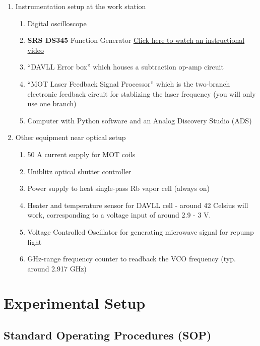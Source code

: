 \documentclass{../lab}
\begin{document}
\begin{enumerate}
    \item Instrumentation setup at the work station
    \begin{enumerate}
        \item Digital oscilloscope
        \item \textbf{SRS DS345} Function Generator \href{https://youtu.be/PrM8DHFOFS0}{Click here to watch an instructional video}
        \item ``DAVLL Error box'' which houses a subtraction op-amp circuit
        \item ``MOT Laser Feedback Signal Processor'' which is the two-branch electronic feedback circuit for stablizing the laser frequency (you will only use one branch)
        \item Computer with Python software and an Analog Discovery Studio (ADS)
    \end{enumerate}
    
    \item Other equipment near optical setup
    \begin{enumerate}
        \item 50 A current supply for MOT coils
        \item Uniblitz optical shutter controller
        \item Power supply to heat single-pass Rb vapor cell (always on)
        \item Heater and temperature sensor for DAVLL cell - around 42 Celsius will work, corresponding to a voltage input of around 2.9 - 3 V. %
        \item Voltage Controlled Oscillator for generating microwave signal for repump light
        \item GHz-range frequency counter to readback the VCO frequency (typ. around 2.917 GHz)
    \end{enumerate}
\end{enumerate}

\section{Experimental Setup}

\subsection{Standard Operating Procedures (SOP)}
\end{document}

